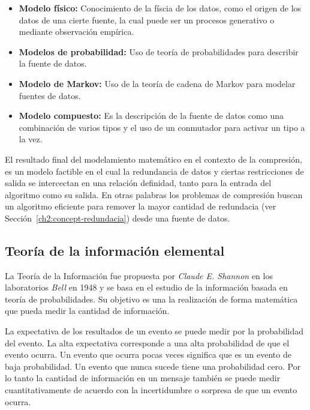 \begin{itemize}
	\menorEspacioItemize
	\item \textbf{Modelo físico:} Conocimiento de la físcia de los datos, como el origen de los datos de una cierte fuente, la cual puede ser un procesos generativo o mediante observación empírica.
	\item \textbf{Modelos de probabilidad:} Uso de teoría de probabilidades para describir la fuente de datos.
	\item \textbf{Modelo de Markov:} Uso de la teoría de cadena de Markov para modelar fuentes de datos.
	\item \textbf{Modelo compuesto:} Es la descripción de la fuente de datos como una combinación de varios tipos y el uso de un conmutador para activar un tipo a la vez.

\end{itemize}

El resultado final del modelamiento matemático en el contexto de la compresión, es un modelo factible en el cual la redundancia de datos y ciertas restricciones de salida se intercectan en una relación definidad, tanto para la entrada del algoritmo como su salida. En otras palabras los problemas de compresión  buscan un algoritmo eficiente para remover la mayor cantidad de redundacia (ver Sección~\ref{ch2:concept-redundacia}) desde una fuente de datos.

\uncm
 




\subsection{Teoría de la información elemental}


La Teoría de la Información fue propuesta por \emph{Claude E. Shannon} en los laboratorios \emph{Bell} en 1948 y se basa en el estudio de la información basada en teoría de probabilidades. Su objetivo es una la realización de forma matemática que pueda medir la cantidad de información.

La expectativa de los resultados de un evento se puede medir por la probabilidad del evento. La alta expectativa corresponde a una alta probabilidad de que el evento ocurra. Un evento que ocurra pocas veces significa que es un evento de baja probabilidad. Un evento que nunca sucede tiene una probabilidad cero. Por lo tanto la cantidad de información en un mensaje también se puede medir cuantitativamente de acuerdo con la incertidumbre o sorpresa de que un evento ocurra.





